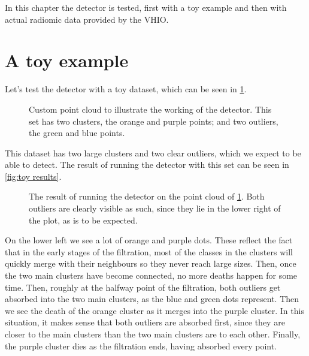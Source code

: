 \documentclass[../main.tex]{subfiles}
\begin{document}
In this chapter the detector is tested, first with a toy example and then with actual
radiomic data provided by the VHIO. 

\section{A toy example}
Let's test the detector with a toy dataset, which can be seen in \cref{fig:clusters}.
\begin{figure}[htb]
	\centering \small \sffamily
	
	\caption{Custom point cloud to illustrate the working of the detector. This set has two
	clusters, the orange and purple points; and two outliers, the green and blue points.}
	\label{fig:clusters}
\end{figure}
This dataset has two large clusters and two clear outliers, which we expect to be able to
detect. The result of running the detector with this set can be seen in \cref{fig:toy
results}. 
\begin{figure}[htb]
	\centering \small \sffamily
	
	\caption{The result of running the detector on the point cloud of \cref{fig:clusters}.
		Both outliers are clearly visible as such, since they lie in the lower right of the
	plot, as is to be expected.}
	\label{fig:toy results}
\end{figure}
On the lower left we see a lot of orange and purple dots. These reflect the fact that in
the early stages of the filtration, most of the classes in the clusters will quickly merge
with their neighbours so they never reach large sizes. Then, once the two main clusters
have become connected, no more deaths happen for some time. Then, roughly at the halfway
point of the filtration, both outliers get absorbed into the two main clusters, as the
blue and green dots represent. Then we see the death of the orange cluster as it merges
into the purple cluster. In this situation, it makes sense that both outliers are absorbed
first, since they are closer to the main clusters than the two main clusters are to each
other. Finally, the purple cluster dies as the filtration ends, having absorbed every
point. 
\end{document}
